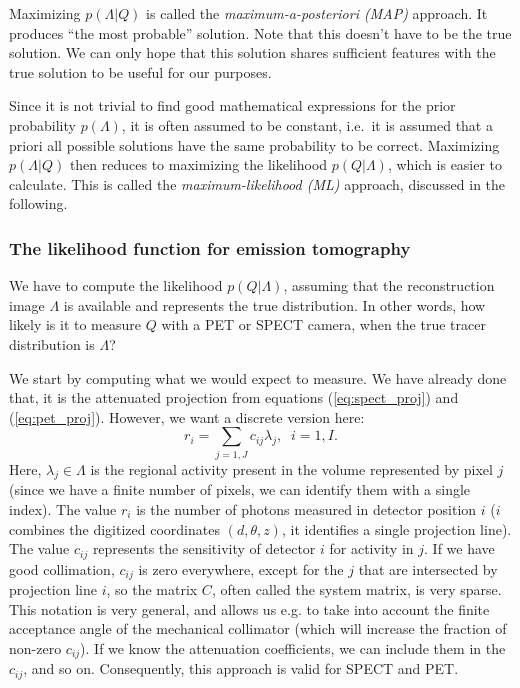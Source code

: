 Maximizing $p(\Lambda | Q)$ is called the {\em maximum-a-posteriori (MAP)}
approach. It produces ``the most probable'' solution. Note that this doesn't
have to be the true solution. We can only hope that this solution shares
sufficient features with the true solution to be useful for our purposes.

Since it is not trivial to find good mathematical expressions for the prior
probability $p(\Lambda)$, it is often assumed to be constant, i.e.\ it is
assumed that a priori all possible solutions have the same probability to be
correct.  Maximizing $p(\Lambda | Q)$ then reduces to maximizing the
likelihood $p(Q | \Lambda)$, which is easier to calculate.  This is called the
{\em maximum-likelihood (ML)} approach, discussed in the following.

\subsubsection{The likelihood function for emission tomography}
We have to compute the likelihood $p(Q | \Lambda)$, assuming that the
reconstruction image $\Lambda$ is available and represents the true
distribution. In other words, how likely is it to measure $Q$ with a PET or
SPECT camera, when the true tracer distribution is $\Lambda$?

We start by computing what we would expect to measure. We have already
done that, it is the attenuated projection from equations
(\ref{eq:spect_proj}) and (\ref{eq:pet_proj}). However, we want a
discrete version here:
\begin{equation}
  r_i = \sum_{j=1,J} c_{ij} \lambda_j, \;\; i = 1,I.  \label{jn:mlproj}
\end{equation}
Here, $\lambda_j \in \Lambda$ is the regional activity present in the
volume represented by pixel $j$ (since we have a finite number of
pixels, we can identify them with a single index). The value $r_i$ is
the number of photons measured in detector position $i$ ($i$ combines
the digitized coordinates $(d,\theta,z)$, it identifies a single
projection line). The value $c_{ij}$ represents the sensitivity of
detector $i$ for activity in $j$. If we have good collimation,
$c_{ij}$ is zero everywhere, except for the $j$ that are intersected
by projection line $i$, so the matrix $C$, often called the system
matrix, is very sparse. This notation is very general, and allows us
e.g. to take into account the finite acceptance angle of the
mechanical collimator (which will increase the fraction of non-zero
$c_{ij}$). If we know the attenuation coefficients, we can include
them in the $c_{ij}$, and so on. Consequently, this approach is valid
for SPECT and PET.

